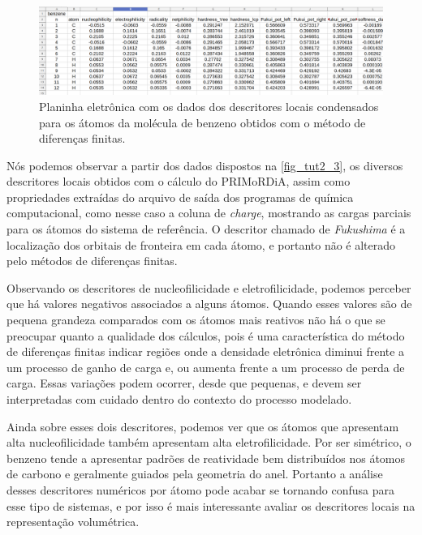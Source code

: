 \documentclass[a4paper,11pt]{refart}
\begin{document}
\hspace*{-1.2\leftmarginwidth}
\begin{minipage}{\fullwidth}
	\begin{figure}[H]
		\begin{center}
			\includegraphics[width=7in]{images/tut2_img4}
			\caption{Planinha eletrônica com os dados dos descritores locais condensados para os átomos da molécula de benzeno obtidos com o método de diferenças finitas.}
			\label{fig_tut2_3}
		\end{center}
	\end{figure}
\end{minipage}

Nós podemos observar a partir dos dados dispostos na \autoref{fig_tut2_3}, os diversos descritores locais obtidos com o cálculo do PRIMoRDiA, assim como propriedades extraídas do arquivo de saída dos programas de química computacional, como nesse caso a coluna de \emph{charge}, mostrando as cargas parciais para os átomos do sistema de referência. O descritor chamado de \emph{Fukushima} é a localização dos orbitais de fronteira em cada átomo, e portanto não é alterado pelo métodos de diferenças finitas. 

Observando os descritores de nucleofilicidade e eletrofilicidade, podemos perceber que há valores negativos associados a alguns átomos. Quando esses valores são de pequena grandeza comparados com os átomos mais reativos não há o que se preocupar quanto a qualidade dos cálculos, pois é uma característica do método de diferenças finitas indicar regiões onde a densidade eletrônica diminui frente a um processo de ganho de carga e, ou aumenta frente a um processo de perda de carga. Essas variações podem ocorrer, desde que pequenas, e devem ser interpretadas com cuidado dentro do contexto do processo modelado. 

Ainda sobre esses dois descritores, podemos ver que os átomos que apresentam alta nucleofilicidade também apresentam alta eletrofilicidade. Por ser simétrico, o benzeno tende a apresentar padrões de reatividade bem distribuídos nos átomos de carbono e geralmente guiados pela geometria do anel. Portanto a análise desses descritores numéricos por átomo pode acabar se tornando confusa para esse tipo de sistemas, e por isso é mais interessante avaliar os descritores locais na representação volumétrica. 
\end{document}
